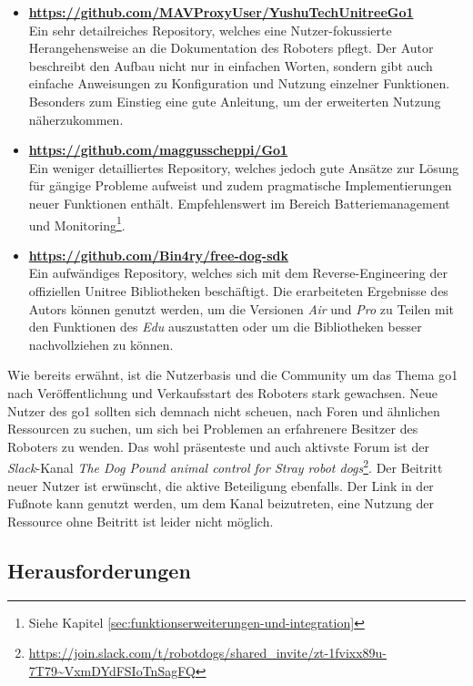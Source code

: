 \begin{itemize}
    \item \textbf{\url{https://github.com/MAVProxyUser/YushuTechUnitreeGo1}}\\
    Ein sehr detailreiches Repository, welches eine Nutzer-fokussierte Herangehensweise an die Dokumentation des Roboters
    pflegt.
    Der Autor beschreibt den Aufbau nicht nur in einfachen Worten, sondern gibt auch einfache Anweisungen zu Konfiguration
    und Nutzung einzelner Funktionen.
    Besonders zum Einstieg eine gute Anleitung, um der erweiterten Nutzung näherzukommen.
    \item \textbf{\url{https://github.com/maggusscheppi/Go1}}\\
    Ein weniger detailliertes Repository, welches jedoch gute Ansätze zur Lösung für gängige Probleme aufweist und zudem
    pragmatische Implementierungen neuer Funktionen enthält.
    Empfehlenswert im Bereich Batteriemanagement und Monitoring\footnote{Siehe Kapitel \ref{sec:funktionserweiterungen-und-integration}}.
    \item \textbf{\url{https://github.com/Bin4ry/free-dog-sdk}}\\
    Ein aufwändiges Repository, welches sich mit dem Reverse-Engineering der offiziellen Unitree Bibliotheken beschäftigt.
    Die erarbeiteten Ergebnisse des Autors können genutzt werden, um die Versionen \emph{Air} und \emph{Pro} zu Teilen
    mit den Funktionen des \emph{Edu} auszustatten oder um die Bibliotheken besser nachvollziehen zu können.
\end{itemize}



Wie bereits erwähnt, ist die Nutzerbasis und die Community um das Thema \gls{go1} nach Veröffentlichung und Verkaufsstart
des Roboters stark gewachsen.
Neue Nutzer des \gls{go1} sollten sich demnach nicht scheuen, nach Foren und ähnlichen Ressourcen zu suchen, um sich bei
Problemen an erfahrenere Besitzer des Roboters zu wenden.
Das wohl präsenteste und auch aktivste Forum ist der \emph{Slack}-Kanal
\emph{The Dog Pound animal control for Stray robot dogs}\footnote{\url{https://join.slack.com/t/robotdogs/shared_invite/zt-1fvixx89u-7T79~VxmDYdFSIoTnSagFQ}}.
Der Beitritt neuer Nutzer ist erwünscht, die aktive Beteiligung ebenfalls.
Der Link in der Fußnote kann genutzt werden, um dem Kanal beizutreten, eine Nutzung der Ressource ohne Beitritt ist leider
nicht möglich.

\subsection{Herausforderungen}
\label{subsec:herausforderungen}

